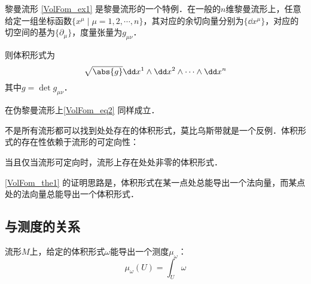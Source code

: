 \begin{example}{黎曼流形}
\autoref{VolFom_ex1} 是黎曼流形的一个特例．在一般的$n$维黎曼流形上，任意给定一组坐标函数$\{x^\mu\mid \mu=1, 2, \cdots, n\}$，其对应的余切向量分别为$\{\dd x^\mu\}$，对应的切空间的基为$\{\partial_\mu\}$，度量张量为$g_{\mu\nu}$．

则体积形式为
\begin{equation}\label{VolFom_eq2}
\sqrt{\abs{g}}\dd x^1\wedge \dd x^2\wedge \cdots \wedge \dd x^n
\end{equation}
其中$g=\det g_{\mu\nu}$．

在伪黎曼流形上\autoref{VolFom_eq2} 同样成立．
\end{example}



不是所有流形都可以找到处处存在的体积形式，莫比乌斯带就是一个反例．体积形式的存在性依赖于流形的可定向性：


\begin{theorem}{}\label{VolFom_the1}
当且仅当流形可定向时，流形上存在处处非零的体积形式．
\end{theorem}

\autoref{VolFom_the1} 的证明思路是，体积形式在某一点处总能导出一个法向量，而某点处的法向量总能导出一个体积形式．



\subsection{与测度的关系}


流形$M$上，给定的体积形式$\omega$能导出一个测度$\mu_{\omega}$：
\begin{equation}
\mu_\omega(U) = \int_U \omega
\end{equation}
















